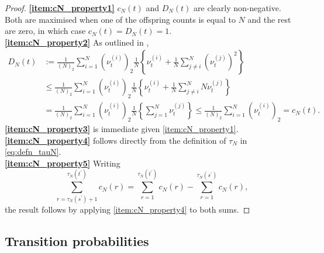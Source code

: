 \begin{proof}
\textbf{\ref{item:cN_property1}}  $c_N(t)$ and $D_N(t)$ are clearly non-negative. Both are maximised when one of the offspring counts is equal to $N$ and the rest are zero, in which case $c_N(t) = D_N(t) = 1$.\\
\textbf{\ref{item:cN_property2}} As outlined in \textcite[p.9]{koskela2018},
\begin{align*}
D_N(t) &:= \frac{1}{(N)_2} \sum_{i=1}^N (\nu_t^{(i)})_2 \frac{1}{N} \left\{  \nu_t^{(i)} + \frac{1}{N} \sum_{j\neq i}^N (\nu_t^{(j)})^2 \right\} \\
&\leq \frac{1}{(N)_2} \sum_{i=1}^N (\nu_t^{(i)})_2 \frac{1}{N} \left\{  \nu_t^{(i)} + \frac{1}{N} \sum_{j\neq i}^N N \nu_t^{(j)} \right\} \\
&= \frac{1}{(N)_2} \sum_{i=1}^N (\nu_t^{(i)})_2 \frac{1}{N} \left\{ \sum_{j =1}^N \nu_t^{(j)} \right\}
\leq \frac{1}{(N)_2} \sum_{i=1}^N (\nu_t^{(i)})_2
= c_N(t) .
\end{align*}
\textbf{\ref{item:cN_property3}} is immediate given \ref{item:cN_property1}.\\
\textbf{\ref{item:cN_property4}} follows directly from the definition of $\tau_N$ in \eqref{eq:defn_tauN}.\\
\textbf{\ref{item:cN_property5}} Writing
\begin{equation*}
\sum_{r=\tau_N(s^\prime)+1}^{\tau_N(t^\prime)} c_N(r)
= \sum_{r=1}^{\tau_N(t^\prime)} c_N(r) 
        - \sum_{r=1}^{\tau_N(s^\prime)} c_N(r) ,
\end{equation*}
the result follows by applying \ref{item:cN_property4} to both sums.
\end{proof}



\subsection{Transition probabilities \seb{$\sim$} }


